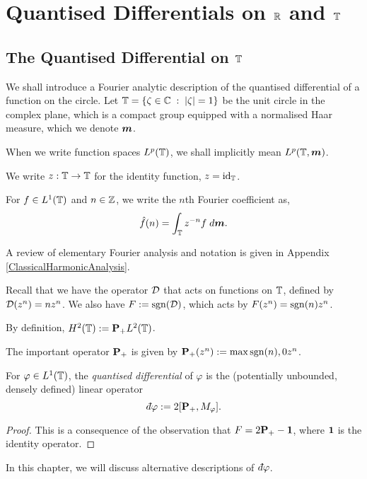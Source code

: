 
\chapter{Quantised Differentials on $\mathbb{R}$ and $\mathbb{T}$} %

\label{QuantisedDifferentialsOnRandT} %



\section{The Quantised Differential on $\mathbb{T}$}
We shall introduce a Fourier analytic description of the quantised differential
of a function on the circle. Let $\mathbb{T} = \{\zeta \in \mathbb{C}\;:\;|\zeta|=1\}$
be the unit circle in the complex plane, which is a compact group
equipped with a normalised Haar measure, which we denote $\boldsymbol{m}$.

When we write function spaces $L^p(\mathbb{T})$, we shall
implicitly mean $L^p(\mathbb{T},\boldsymbol{m})$.

We write $z:\mathbb{T}\to\mathbb{T}$ for the identity function, $z = \operatorname{id}_{\mathbb{T}}$.

For $f \in L^1(\mathbb{T})$ and $n \in \mathbb{Z}$, we write the $n$th Fourier coefficient as,
\begin{equation}
    \hat{f}(n) = \int_{\mathbb{T}} z^{-n}f\;d\boldsymbol{m}.
\end{equation}

A review of elementary Fourier analysis and
notation is given in Appendix \ref{ClassicalHarmonicAnalysis}.

Recall that we have the operator $\mathcal{D}$ that acts on functions on $\mathbb{T}$, defined
by $\mathcal{D}(z^n) = nz^n$. We also have $F := \operatorname{sgn}(\mathcal{D})$, which acts by $F(z^n) = \operatorname{sgn}(n)z^n$.

By definition, $H^2(\mathbb{T}) := \mathbf{P}_+L^2(\mathbb{T})$.

The important operator $\mathbf{P}_+$ is given by $\mathbf{P}_+(z^n) := \max{\operatorname{sgn}(n),0}z^n$.

\begin{proposition}
    For $\varphi \in L^1(\mathbb{T})$, the \emph{quantised differential} of $\varphi$ is the (potentially unbounded, densely defined) linear operator
    \begin{equation}
        \qd\varphi := 2[\Proj_+,M_\varphi].
    \end{equation}
\end{proposition}
\begin{proof}
    This is a consequence of the observation that $F = 2\mathbf{P}_+-\mathbf{1}$,
    where $\mathbf{1}$ is the identity operator.
\end{proof}
In this chapter, we will discuss alternative descriptions of $\qd \varphi$.


